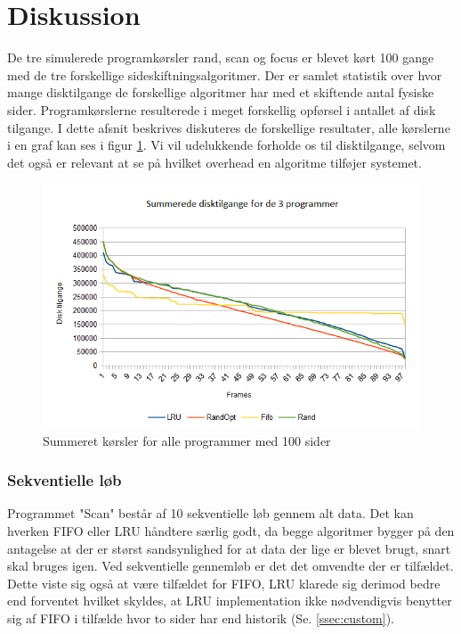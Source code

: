 \section{Diskussion}
De tre simulerede programkørsler rand, scan og focus er blevet kørt 100 gange med de tre forskellige sideskiftningsalgoritmer. Der er samlet statistik over hvor mange disktilgange de forskellige algoritmer har med et skiftende antal fysiske sider. Programkørslerne resulterede i meget forskellig opførsel i antallet af disk tilgange. I dette afsnit beskrives diskuteres de forskellige resultater, alle kørslerne i en graf kan ses i figur \ref{fig:all}. Vi vil udelukkende forholde os til disktilgange, selvom det også er relevant at se på hvilket overhead en algoritme tilføjer systemet.


\begin{figure}[ht]
\centerline{\includegraphics[scale=1]{graph/stat_all}}
\FloatBarrier
\caption{Summeret kørsler for alle programmer med 100 sider}
\label{fig:all}
\end{figure}

\subsubsection{Sekventielle løb}
Programmet "Scan" består af 10 sekventielle løb gennem alt data. Det kan hverken FIFO eller LRU håndtere særlig godt, da begge algoritmer bygger på den antagelse at der er størst sandsynlighed for at data der lige er blevet brugt, snart skal bruges igen. Ved sekventielle gennemløb er det det omvendte der er tilfældet. Dette viste sig også at være tilfældet for FIFO, LRU klarede sig derimod bedre end forventet hvilket skyldes, at LRU implementation ikke nødvendigvis benytter sig af FIFO i tilfælde hvor to sider har end historik (Se. \ref{ssec:custom}).

